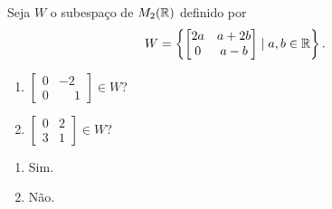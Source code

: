 \documentclass[12pt]{exam}
\begin{document}
\begin{exercicio}
  Seja $W$ o subespaço de $M_2(\mathbb{R})$ definido por
  \[
  W = \left\{\begin{bmatrix}2a & a + 2b\\0 & a - b\end{bmatrix} \mid a, b \in \mathbb{R}\right\}.
  \]
  \begin{enumerate}[label={\alph*})]
    \item $\begin{bmatrix}0 & -2\\0 & \phantom{-} 1\end{bmatrix} \in W$?

    \item $\begin{bmatrix}0 & 2\\3 & 1\end{bmatrix} \in W$?
  \end{enumerate}
  \begin{solucao}
    \begin{enumerate}[label={\alph*})]
      \item Sim.

      \item Não.
    \end{enumerate}
  \end{solucao}
\end{exercicio}
\end{document}

